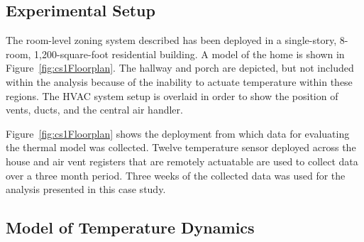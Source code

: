 \subsection{Experimental Setup}
\label{sec:experimentalSetup}


The room-level zoning system described has been deployed in a single-story,
8-room, 1,200-square-foot residential building. A model of the home is shown in
Figure~\ref{fig:cs1Floorplan}. The hallway and porch are depicted, but not included
within the analysis because of the inability to actuate temperature within these
regions. The HVAC system setup is overlaid in order to show the position of
vents, ducts, and the central air handler.


Figure~\ref{fig:cs1Floorplan} shows the deployment from which data for
evaluating the thermal model was collected. Twelve temperature sensor deployed
across the house and air vent registers that are remotely actuatable are used to
collect data over a three month period. Three weeks of the collected data was
used for the analysis presented in this case study.

\subsection{Model of Temperature Dynamics}
\label{sec:model}



